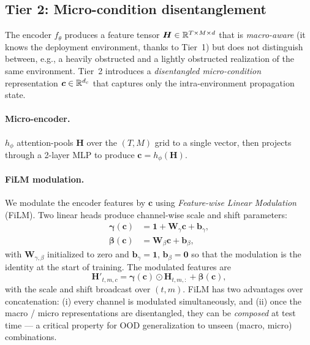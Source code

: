 \subsection{Tier 2: Micro-condition disentanglement}
\label{sec:tier2}

The encoder $f_\theta$ produces a feature tensor
$\bm{H} \in \mathbb{R}^{T \times M \times d}$ that is
\emph{macro-aware} (it knows the deployment environment, thanks to
Tier~1) but does not distinguish between, e.g., a heavily
obstructed and a lightly obstructed realization of the same
environment. Tier~2 introduces a \emph{disentangled micro-condition}
representation $\bm{c} \in \mathbb{R}^{d_c}$ that captures only the
intra-environment propagation state.

\paragraph{Micro-encoder.}
$h_\phi$ attention-pools $\bm{H}$ over the $(T, M)$ grid to a
single vector, then projects through a 2-layer MLP to produce
$\bm{c} = h_\phi(\bm{H})$.

\paragraph{FiLM modulation.}
We modulate the encoder features by $\bm{c}$ using
\emph{Feature-wise Linear Modulation}~\cite{film2018}
(FiLM). Two linear heads produce channel-wise scale and shift
parameters:
\begin{align}
  \bm{\gamma}(\bm{c}) &= \bm{1} + \bm{W}_\gamma \bm{c} + \bm{b}_\gamma,
  \label{eq:gamma}\\
  \bm{\beta}(\bm{c}) &= \bm{W}_\beta \bm{c} + \bm{b}_\beta,
  \label{eq:beta}
\end{align}
with $\bm{W}_{\gamma, \beta}$ initialized to zero and
$\bm{b}_\gamma = \bm{1}$, $\bm{b}_\beta = \bm{0}$ so that the
modulation is the identity at the start of training. The
modulated features are
\begin{equation}
  \bm{H}'_{t,m,c} = \bm{\gamma}(\bm{c}) \odot \bm{H}_{t,m,:} + \bm{\beta}(\bm{c}),
  \label{eq:film}
\end{equation}
with the scale and shift broadcast over $(t, m)$. FiLM has two
advantages over concatenation: (i) every channel is modulated
simultaneously, and (ii) once the macro / micro representations
are disentangled, they can be \emph{composed} at test time --- a
critical property for OOD generalization to unseen (macro, micro)
combinations.

